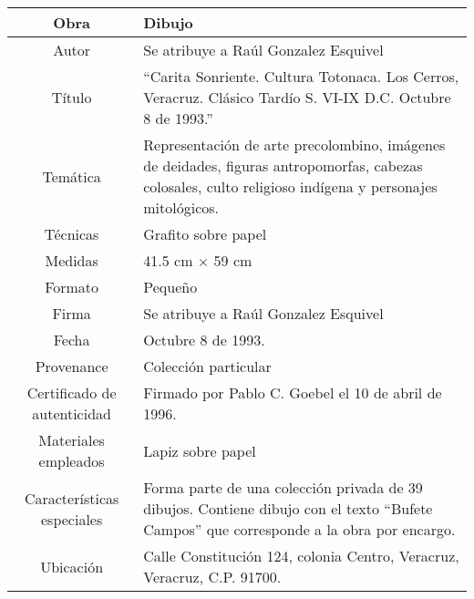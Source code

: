 \documentclass[10pt,letter]{report}
\begin{document}
\begin{table}[H]
\centering
\begin{tabular}{|c|m{}|}
\hline
Obra& Dibujo	\\
\hline
Autor & Se atribuye a Ra\'ul Gonzalez Esquivel\\
\hline
T\'itulo &``Carita Sonriente. Cultura Totonaca. Los Cerros, Veracruz. Cl\'asico Tard\'io S. VI-IX D.C. Octubre 8 de 1993.'' \\
\hline
Tem\'atica & Representaci\'on de arte precolombino, im\'agenes de deidades, figuras antropomorfas, cabezas colosales, culto religioso ind\'igena y personajes mitol\'ogicos.\\
\hline
T\'ecnicas &Grafito sobre papel \\
\hline
Medidas & 41.5 cm $\times$ 59 cm \\
\hline
 Formato & Peque\~no \\
 \hline
 Firma & Se atribuye a Ra\'ul Gonzalez Esquivel\\ 
 \hline
  Fecha & Octubre 8 de 1993.\\
 \hline
 Provenance & Colecci\'on particular\\
 \hline
 Certificado de autenticidad& Firmado por Pablo C. Goebel el 10 de abril de 1996.  \\
 \hline 
  Materiales empleados & Lapiz sobre papel\\
 \hline
 Caracter\'isticas especiales & Forma parte de una colecci\'on privada de 39 dibujos. 
Contiene dibujo con el texto ``Bufete Campos'' que corresponde a la obra por encargo. \\
\hline 
Ubicaci\'on & Calle Constituci\'on 124, colonia Centro, Veracruz, Veracruz, C.P. 91700.\\
\hline

\end{tabular}
\end{table}
\end{document}
